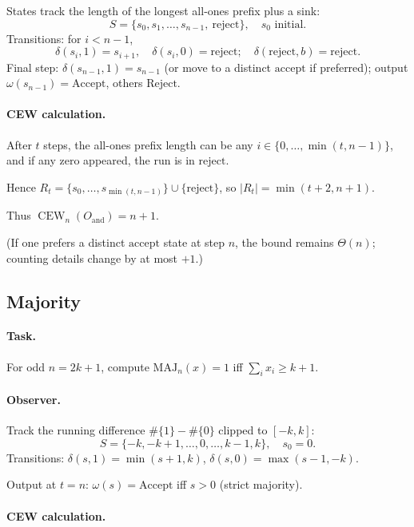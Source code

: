 \documentclass[12pt]{article}
\theoremstyle{definition}
\theoremstyle{definition}
\theoremstyle{remark}
\theoremstyle{remark}
\begin{document}
States track the length of the longest all-ones prefix plus a sink:
\[
S=\{s_0, s_1,\dots, s_{n-1},\ \mathrm{reject}\},\quad s_0\text{ initial}.
\]
Transitions: for $i<n-1$,
\[
\delta(s_i,1)=s_{i+1},\quad \delta(s_i,0)=\mathrm{reject};\quad \delta(\mathrm{reject},b)=\mathrm{reject}.
\]
Final step: $\delta(s_{n-1},1)=s_{n-1}$ (or move to a distinct $\mathrm{accept}$ if preferred); output $\omega(s_{n-1})=\mathrm{Accept}$, others $\mathrm{Reject}$.

\paragraph{CEW calculation.}

After $t$ steps, the all-ones prefix length can be any $i\in\{0,\dots,\min(t,n-1)\}$, and if any zero appeared, the run is in $\mathrm{reject}$.

Hence $R_t=\{s_0,\dots, s_{\min(t,n-1)}\}\cup\{\mathrm{reject}\}$, so $|R_t|=\min(t+2,n+1)$.

Thus $\operatorname{CEW}_n(O_{\mathrm{and}})=n+1$.

(If one prefers a distinct $\mathrm{accept}$ state at step $n$, the bound remains $\Theta(n)$; counting details change by at most $+1$.)

\subsection{Majority}

\paragraph{Task.} For odd $n=2k+1$, compute $\mathrm{MAJ}_n(x)=1$ iff $\sum_i x_i\ge k+1$.

\paragraph{Observer.}

Track the running difference $\#\{1\}-\#\{0\}$ clipped to $[-k,k]$:
\[
S=\{-k, -k+1,\dots, 0,\dots, k-1, k\},\quad s_0=0.
\]
Transitions: $\delta(s,1)=\min(s+1,k)$, $\delta(s,0)=\max(s-1,-k)$.

Output at $t=n$: $\omega(s)=\mathrm{Accept}$ iff $s>0$ (strict majority).

\paragraph{CEW calculation.}
\end{document}
